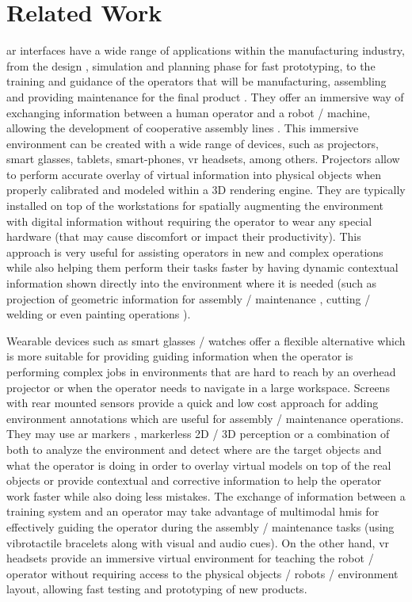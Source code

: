 \section{Related Work}\label{sec:related-work}

\gls{ar} interfaces \cite{Bimber2005} have a wide range of applications within the manufacturing industry, from the design \cite{Nee2012}, simulation and planning phase for fast prototyping, to the training and guidance \cite{Webel2011} of the operators that will be manufacturing, assembling and providing maintenance for the final product \cite{Zhu2014}. They offer an immersive way of exchanging information between a human operator and a robot / machine, allowing the development of cooperative assembly lines \cite{Lenz2011}. This immersive environment can be created with a wide range of devices, such as projectors, smart glasses, tablets, smart-phones, \gls{vr} headsets, among others. Projectors allow to perform accurate overlay of virtual information into physical objects when properly calibrated \cite{Moreno2012} and modeled within a 3D rendering engine. They are typically installed on top of the workstations for spatially augmenting the environment with digital information without requiring the operator to wear any special hardware (that may cause discomfort or impact their productivity). This approach is very useful for assisting operators in new and complex operations while also helping them perform their tasks faster by having dynamic contextual information shown directly into the environment where it is needed (such as projection of geometric information for assembly / maintenance \cite{Uva2018}, cutting / welding \cite{Doshi2017} or even painting operations \cite{Barbosa2014}).

Wearable devices such as smart glasses / watches offer a flexible alternative \cite{MICHALOS2018194} which is more suitable for providing guiding information when the operator is performing complex jobs in environments that are hard to reach by an overhead projector or when the operator needs to navigate in a large workspace. Screens with rear mounted sensors provide a quick and low cost approach for adding environment annotations which are useful for assembly / maintenance operations. They may use \gls{ar} markers \cite{Siltanen2012}, markerless 2D / 3D perception \cite{Guo2014} or a combination of both to analyze the environment and detect where are the target objects and what the operator is doing \cite{Bannat2008} in order to overlay virtual models on top of the real objects or provide contextual and corrective information to help the operator work faster while also doing less mistakes. The exchange of information between a training system and an operator may take advantage of multimodal \glspl{hmi} \cite{Webel2013} for effectively guiding the operator during the assembly / maintenance tasks (using vibrotactile bracelets along with visual and audio cues). On the other hand, \gls{vr} headsets provide an immersive virtual environment for teaching the robot / operator \cite{ABATE2009318} without requiring access to the physical objects / robots / environment layout, allowing fast testing and prototyping of new products.
